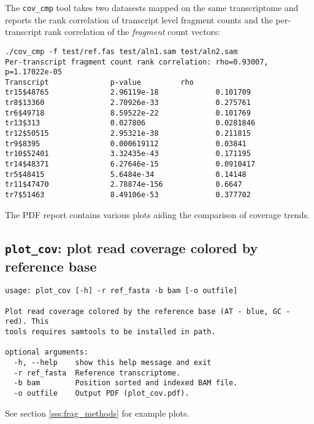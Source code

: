 The \texttt{cov\_cmp} tool takes two datasests mapped on the same transcriptome and reports the rank correlation of transcript level fragment counts and the per-transcript rank correlation of the \emph{fragment} count vectors:

\begin{verbatim}
./cov_cmp -f test/ref.fas test/aln1.sam test/aln2.sam
Per-transcript fragment count rank correlation: rho=0.93007, p=1.17022e-05
Transcript              p-value         rho
tr15$48765              2.96119e-18             0.101709
tr8$13360               2.70926e-33             0.275761
tr6$49718               8.59522e-22             0.101769
tr13$313                0.027806                0.0281846
tr12$50515              2.95321e-38             0.211815
tr9$8395                0.000619112             0.03841
tr10$52401              3.32435e-43             0.171195
tr14$48371              6.27646e-15             0.0910417
tr5$48415               5.6484e-34              0.14148
tr11$47470              2.78874e-156            0.6647
tr7$51463               8.49106e-53             0.377702
\end{verbatim}

The PDF report contains various plots aiding the comparison of coverage trends.

\subsection{{\tt plot\_cov}: plot read coverage colored by reference base}

\begin{verbatim}
usage: plot_cov [-h] -r ref_fasta -b bam [-o outfile]

Plot read coverage colored by the reference base (AT - blue, GC - red). This
tools requires samtools to be installed in path.

optional arguments:
  -h, --help    show this help message and exit
  -r ref_fasta  Reference transcriptome.
  -b bam        Position sorted and indexed BAM file.
  -o outfile    Output PDF (plot_cov.pdf).
\end{verbatim}

See section \ref{sss:frag_methods} for example plots.

